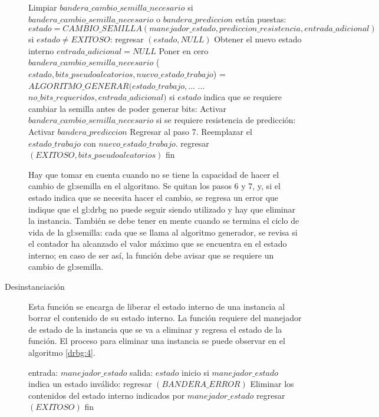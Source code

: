 \begin{description}
\begin{pseudocodigo}[caption={DRBG, generación.}, label={drbg:3}]
        Limpiar $bandera\_cambio\_semilla\_necesario$
        si $bandera\_cambio\_semilla\_necesario$ o $bandera\_prediccion$ están puestas:
          $estado = CAMBIO\_SEMILLA(manejador\_estado, prediccion\_resistencia, entrada\_adicional)$
          si $estado \neq EXITOSO$:
            regresar $(estado, NULL)$
          Obtener el nuevo estado interno
          $entrada\_adicional = NULL$
          Poner en cero $bandera\_cambio\_semilla\_necesario$
        ($estado, bits\_pseudoaleatorios, nuevo\_estado\_trabajo$) = $ALGORITMO\_GENERAR(estado\_trabajo,$...
          ...$no\_bits\_requeridos, entrada\_adicional)$
        si $estado$ indica que se requiere cambiar la semilla antes de poder generar bits:
          Activar $bandera\_cambio\_semilla\_necesario$
          si se requiere resistencia de predicción:
            Activar $bandera\_prediccion$
          Regresar al paso 7.
        Reemplazar el $estado\_trabajo$ con $nuevo\_estado\_trabajo$.
        regresar $(EXITOSO, bits\_pseudoaleatorios)$
      fin
    \end{pseudocodigo}
    Hay que tomar en cuenta cuando no se tiene la capacidad de hacer el cambio
    de \gls{gl:semilla} en el algoritmo. Se quitan los pasos 6 y 7, y, si el
    estado indica que se necesita hacer el cambio, se regresa un error que
    indique que el \gls{gl:drbg} no puede seguir siendo utilizado y hay que
    eliminar la instancia. También se debe tener en mente cuando se termina
    el ciclo de vida de la \gls{gl:semilla}: cada que se llama al algoritmo
    generador, se revisa si el contador ha alcanzado el valor máximo que se
    encuentra en el estado interno; en caso de ser así, la función debe avisar
    que se requiere un cambio de \gls{gl:semilla}.

  \item [Desinstanciación] Esta función se encarga de liberar el estado interno
    de una instancia al borrar el contenido de su estado interno. La función
    requiere del manejador de estado de la instancia que se va a eliminar y
    regresa el estado de la función. El proceso para eliminar una instancia se
    puede observar en el algoritmo \ref{drbg:4}.

    \begin{pseudocodigo}[caption={DRBG, desinstanciación.}, label={drbg:4}]
      entrada:  $manejador\_estado$
      salida:   $estado$
      inicio
        si $manejador\_estado$ indica un estado inválido:
          regresar $(BANDERA\_ERROR)$
        Eliminar los contenidos del estado interno indicados por $manejador\_estado$
        regresar $(EXITOSO)$
      fin
    \end{pseudocodigo}

\end{description}
